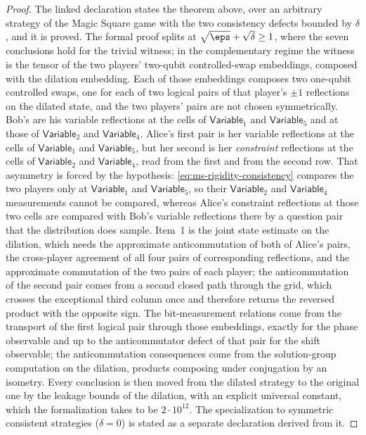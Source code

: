 \begin{proof}
	The linked declaration states the theorem above, over an arbitrary strategy of the Magic Square game with the two consistency defects bounded by $\delta$, and it is proved. The formal proof splits at $\sqrt\eps + \sqrt\delta \ge 1$, where the seven conclusions hold for the trivial witness; in the complementary regime the witness is the tensor of the two players' two-qubit controlled-swap embeddings, composed with the dilation embedding. Each of those embeddings composes two one-qubit controlled swaps, one for each of two logical pairs of that player's $\pm 1$ reflections on the dilated state, and the two players' pairs are not chosen symmetrically. Bob's are his variable reflections at the cells of $\mathsf{Variable}_1$ and $\mathsf{Variable}_5$ and at those of $\mathsf{Variable}_2$ and $\mathsf{Variable}_4$. Alice's first pair is her variable reflections at the cells of $\mathsf{Variable}_1$ and $\mathsf{Variable}_5$, but her second is her \emph{constraint} reflections at the cells of $\mathsf{Variable}_2$ and $\mathsf{Variable}_4$, read from the first and from the second row. That asymmetry is forced by the hypothesis: \eqref{eq:ms-rigidity-consistency} compares the two players only at $\mathsf{Variable}_1$ and $\mathsf{Variable}_5$, so their $\mathsf{Variable}_2$ and $\mathsf{Variable}_4$ measurements cannot be compared, whereas Alice's constraint reflections at those two cells are compared with Bob's variable reflections there by a question pair that the distribution does sample. Item~1 is the joint state estimate on the dilation, which needs the approximate anticommutation of both of Alice's pairs, the cross-player agreement of all four pairs of corresponding reflections, and the approximate commutation of the two pairs of each player; the anticommutation of the second pair comes from a second closed path through the grid, which crosses the exceptional third column once and therefore returns the reversed product with the opposite sign. The bit-measurement relations come from the transport of the first logical pair through those embeddings, exactly for the phase observable and up to the anticommutator defect of that pair for the shift observable; the anticommutation consequences come from the solution-group computation on the dilation, products composing under conjugation by an isometry. Every conclusion is then moved from the dilated strategy to the original one by the leakage bounds of the dilation, with an explicit universal constant, which the formalization takes to be $2 \cdot 10^{12}$. The specialization to symmetric consistent strategies ($\delta = 0$) is stated as a separate declaration derived from it.
\end{proof}

